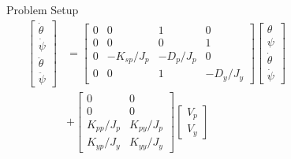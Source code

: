 \documentclass[final]{beamer}
\newlength{\sepwid}
\newlength{\onecolwid}
\begin{document}
\begin{frame}[t]
\begin{columns}[t]
\begin{column}{\onecolwid}
\begin{block}{Problem Setup}
\begin{align*}
\begin{bmatrix}
    \dot\theta\\
    \dot\psi\\
    \ddot{\theta}\\
    \ddot{\psi}
\end{bmatrix}&=
\begin{bmatrix}
    0 & 0 & 1 & 0 \\
    0 & 0 & 0 & 1 \\
    0 & -K_{sp}/J_p & -D_p/J_p & 0 \\
    0 & 0 & 1 & -D_y/J_y 
\end{bmatrix} 
\begin{bmatrix}
    \theta\\
    \psi\\
    \dot{\theta}\\
    \dot{\psi}
\end{bmatrix}
\\&+
\begin{bmatrix}
    0 & 0 \\
    0 & 0 \\
    K_{pp}/J_p & K_{py}/J_p \\
    K_{yp}/J_y & K_{yy}/J_y 
\end{bmatrix}
\begin{bmatrix}
    V_p \\
    V_y 
\end{bmatrix}
\end{align*}

\vskip -1cm
\end{block}

\end{column} %

\begin{column}{\sepwid}\end{column} %

\begin{column}{\onecolwid} %



\end{column}
\end{columns}
\end{frame}
\end{document}
